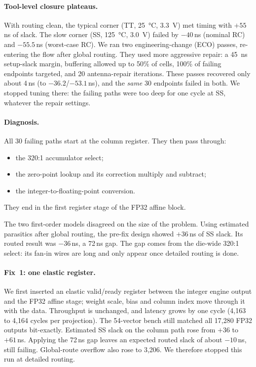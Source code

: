 \paragraph{Tool-level closure plateaus.}
With routing clean, the typical corner (TT, \SI{25}{\celsius}, \SI{3.3}{V}) met timing with $+55$\,ns of slack. The slow corner (SS, \SI{125}{\celsius}, \SI{3.0}{V}) failed by $-40$\,ns (nominal RC) and $-55.5$\,ns (worst-case RC). We ran two engineering-change (ECO) passes, re-entering the flow after global routing. They used more aggressive repair: a \SI{45}{ns} setup-slack margin, buffering allowed up to 50\% of cells, 100\% of failing endpoints targeted, and 20 antenna-repair iterations. These passes recovered only about 4\,ns (to $-36.2$/$-53.1$\,ns), and the \emph{same} 30 endpoints failed in both. We stopped tuning there: the failing paths were too deep for one cycle at SS, whatever the repair settings.

\paragraph{Diagnosis.}
All 30 failing paths start at the column register. They then pass through:
\begin{itemize}
\item the 320:1 accumulator select;
\item the zero-point lookup and its correction multiply and subtract;
\item the integer-to-floating-point conversion.
\end{itemize}
They end in the first register stage of the FP32 affine block.

The two first-order models disagreed on the size of the problem. Using estimated parasitics after global routing, the pre-fix design showed $+36$\,ns of SS slack. Its routed result was $-36$\,ns, a 72\,ns gap. The gap comes from the die-wide 320:1 select: its fan-in wires are long and only appear once detailed routing is done.

\paragraph{Fix~1: one elastic register.}
We first inserted an elastic valid/ready register between the integer engine output and the FP32 affine stage; weight scale, bias and column index move through it with the data. Throughput is unchanged, and latency grows by one cycle (4,163 to 4,164 cycles per projection). The 54-vector bench still matched all 17,280 FP32 outputs bit-exactly. Estimated SS slack on the column path rose from $+36$ to $+61$\,ns. Applying the 72\,ns gap leaves an expected routed slack of about $-10$\,ns, still failing. Global-route overflow also rose to 3,206. We therefore stopped this run at detailed routing.

